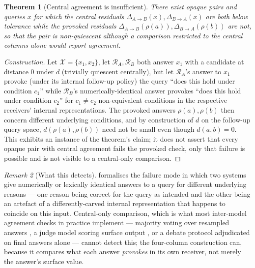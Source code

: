 \documentclass[11pt,twocolumn,a4paper]{article}
\theoremstyle{rdm}
\newtheorem{theorem}{Theorem}[section]
\theoremstyle{definition}
\theoremstyle{remark}
\newtheorem{remark}[theorem]{Remark}
\newcommand{\Rec}{\mathcal{R}}
\newcommand{\Cands}{\mathcal{X}}
\newcommand{\dem}{\Delta}
\begin{document}
\begin{theorem}[Central agreement is insufficient]
\label{thm:route-audit}
There exist opaque pairs and queries $x$ for which the central residuals
$\dem_{A\to B}(x),\dem_{B\to A}(x)$ are both below tolerance while the
provoked residuals $\dem_{A\to B}(\rho(a)),\dem_{B\to A}(\rho(b))$ are not,
so that the pair is non-quiescent although a comparison restricted to the
central columns alone would report agreement.
\end{theorem}

\begin{proof}[Construction]
Let $\Cands=\{x_1,x_2\}$, let $\Rec_A,\Rec_B$ both answer $x_1$ with a
candidate at distance $0$ under $d$ (trivially quiescent centrally), but let
$\Rec_A$'s answer to $x_1$ provoke (under its internal follow-up policy) the
query ``does this hold under condition $c_1$'' while $\Rec_B$'s
numerically-identical answer provokes ``does this hold under condition
$c_2$'' for $c_1\ne c_2$ non-equivalent conditions in the respective
receivers' internal representations. The provoked answers $\rho(a),\rho(b)$
then concern different underlying conditions, and by construction of $d$ on
the follow-up query space, $d(\rho(a),\rho(b))$ need not be small even
though $d(a,b)=0$. This exhibits an instance of the theorem's claim; it does
not assert that every opaque pair with central agreement fails the
provoked check, only that failure is possible and is not visible to a
central-only comparison.
\end{proof}

\begin{remark}[What this detects]
\label{rem:falsefriend}
 formalises the failure mode in which two systems give
numerically or lexically identical answers to a query for different
underlying reasons --- one reason being correct for the query as intended
and the other being an artefact of a differently-carved internal
representation that happens to coincide on this input. Central-only
comparison, which is what most inter-model agreement checks in practice
implement --- majority voting over resampled answers
\citep{wang2022selfconsistency}, a judge model scoring surface output
\citep{zheng2023judging}, or a debate protocol adjudicated on final answers
alone \citep{duimproving2023} --- cannot detect this; the four-column
construction can, because it compares what each answer \emph{provokes} in
its own receiver, not merely the answer's surface value.
\end{remark}
\end{document}
